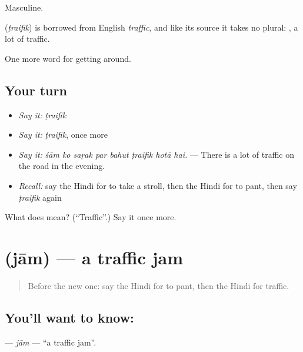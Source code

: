 Masculine.

\begin{cousinweb}
\textbf{} (\emph{ṭraifik}) is borrowed from English \emph{traffic}, and like its source it takes no plural:  , a lot of traffic.
\end{cousinweb}

\begin{grammarlens}[title={What you've built}]
One more word for getting around.
\end{grammarlens}

\subsection*{Your turn}
\begin{itemize}
\raggedright
  \item \emph{Say it:} \emph{ṭraifik}
  \item \emph{Say it:} \emph{ṭraifik}, once more
  \item \emph{Say it:} \emph{śām ko saṛak par bahut ṭraifik hotā hai.} — There is a lot of traffic on the road in the evening.
  \item \emph{Recall:} say the Hindi for to take a stroll, then the Hindi for to pant, then say \emph{ṭraifik} again
\end{itemize}

\begin{tcolorbox}[breakable,colback=teal!4,colframe=teal!35!black,title={Before you move on}]
What does  mean? (\textquotedblleft{}Traffic\textquotedblright{}.) Say it once more.
\end{tcolorbox}
\section[\texorpdfstring{\hi{जाम} (jām)}{जाम (jām)}]{ (jām) — a traffic jam}

\label{lesson:HI-C404-jam}



\begin{quote}
Before the new one: say the Hindi for to pant, then the Hindi for traffic.
\end{quote}

\subsection*{You'll want to know: }
\textbf{} — \emph{jām} — \textquotedblleft{}a traffic jam\textquotedblright{}.

